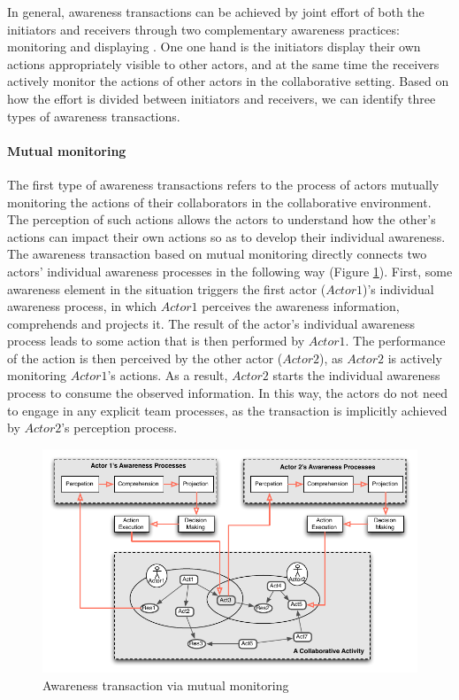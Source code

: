 In general, awareness transactions can be achieved by joint effort of both the initiators and receivers through two complementary awareness practices: monitoring and displaying \cite{heath2002a}. One one hand is the initiators display their own actions appropriately visible to other actors, and at the same time the receivers actively monitor the actions of other actors in the collaborative setting. Based on how the effort is divided between initiators and receivers, we can identify three types of awareness transactions.

\paragraph*{Mutual monitoring} %
\label{par:monitoring}
The first type of awareness transactions refers to the process of actors mutually monitoring the actions of their collaborators in the collaborative environment. The perception of such actions allows the actors to understand how the other's actions can impact their own actions so as to develop their individual awareness. The awareness transaction based on mutual monitoring directly connects two actors' individual awareness processes in the following way (Figure \ref{fig:trans_monitoring}). First, some awareness element in the situation triggers the first actor ($Actor1$)'s individual awareness process, in which $Actor1$ perceives the awareness information, comprehends and projects it. The result of the actor's individual awareness process leads to some action that is then performed by $Actor1$. The performance of the action is then perceived by the other actor ($Actor2$), as $Actor2$ is actively monitoring $Actor1$'s actions. As a result, $Actor2$ starts the individual awareness process to consume the observed information. In this way, the actors do not need to engage in any explicit team processes, as the transaction is implicitly achieved by $Actor2$'s perception process.

\begin{figure}[htbp] %
   \centering
   \includegraphics{trans_monitoring.pdf} 
   \caption{Awareness transaction via mutual monitoring}
   \label{fig:trans_monitoring}
\end{figure}

